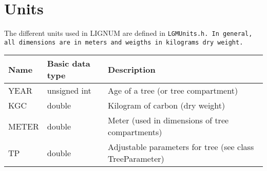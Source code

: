 
\section{Units}

The different units used in LIGNUM are defined in \tt LGMUnits.h\rm. 
In general, all dimensions are in meters and weigths in
kilograms dry weight. \linebreak

\begin{tabular}{|l|l|p{5.0cm}|} \hline
Name & Basic data type & Description \\ \hline
YEAR & unsigned int & Age of a tree (or tree compartment) \\ \hline
KGC  & double       & Kilogram of carbon (dry weight)  \\ \hline
METER & double       & Meter (used in dimensions of tree compartments) \\ \hline
TP   & double       & Adjustable parameters for tree (see class
TreeParameter) \\ \hline
\end{tabular}

